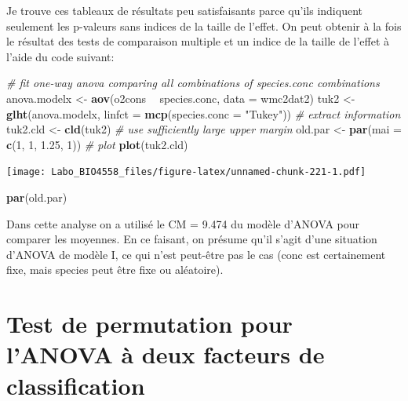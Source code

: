 \documentclass[12pt,]{book}
\newenvironment{Shaded}{\begin{snugshade}}{\end{snugshade}}
\newcommand{\CommentTok}[1]{\textcolor[rgb]{0.37,0.37,0.37}{\textit{#1}}}
\newcommand{\DataTypeTok}[1]{\textcolor[rgb]{0.27,0.27,0.27}{#1}}
\newcommand{\DecValTok}[1]{\textcolor[rgb]{0.06,0.06,0.06}{#1}}
\newcommand{\FloatTok}[1]{\textcolor[rgb]{0.06,0.06,0.06}{#1}}
\newcommand{\KeywordTok}[1]{\textcolor[rgb]{0.27,0.27,0.27}{\textbf{#1}}}
\newcommand{\NormalTok}[1]{#1}
\newcommand{\OperatorTok}[1]{\textcolor[rgb]{0.43,0.43,0.43}{\textbf{#1}}}
\newcommand{\StringTok}[1]{\textcolor[rgb]{0.5,0.5,0.5}{#1}}
\begin{document}
Je trouve ces tableaux de résultats peu satisfaisants parce qu'ils indiquent seulement les p-valeurs sans indices de la taille de l'effet. On peut obtenir à la fois le résultat des tests de comparaison multiple et un indice de la taille de l'effet à l'aide du code suivant:

\begin{Shaded}
\begin{Highlighting}[]
\CommentTok{# fit one-way anova comparing all combinations of species.conc combinations}
\NormalTok{anova.modelx <-}\StringTok{ }\KeywordTok{aov}\NormalTok{(o2cons }\OperatorTok{~}\StringTok{ }\NormalTok{species.conc, }\DataTypeTok{data =}\NormalTok{ wmc2dat2)}
\NormalTok{tuk2 <-}\StringTok{ }\KeywordTok{glht}\NormalTok{(anova.modelx, }\DataTypeTok{linfct =} \KeywordTok{mcp}\NormalTok{(}\DataTypeTok{species.conc =} \StringTok{"Tukey"}\NormalTok{))}
\CommentTok{# extract information}
\NormalTok{tuk2.cld <-}\StringTok{ }\KeywordTok{cld}\NormalTok{(tuk2)}
\CommentTok{# use sufficiently large upper margin}
\NormalTok{old.par <-}\StringTok{ }\KeywordTok{par}\NormalTok{(}\DataTypeTok{mai =} \KeywordTok{c}\NormalTok{(}\DecValTok{1}\NormalTok{, }\DecValTok{1}\NormalTok{, }\FloatTok{1.25}\NormalTok{, }\DecValTok{1}\NormalTok{))}
\CommentTok{# plot}
\KeywordTok{plot}\NormalTok{(tuk2.cld)}
\end{Highlighting}
\end{Shaded}

\texttt{[image: Labo\_BIO4558\_files/figure-latex/unnamed-chunk-221-1.pdf]}

\begin{Shaded}
\begin{Highlighting}[]
\KeywordTok{par}\NormalTok{(old.par)}
\end{Highlighting}
\end{Shaded}

Dans cette analyse on a utilisé le CM = 9.474 du modèle d'ANOVA pour comparer les moyennes. En ce faisant, on présume qu'il s'agit d'une situation d'ANOVA de modèle I, ce qui n'est peut-être pas le cas (conc est certainement fixe, mais species peut être fixe ou aléatoire).

\hypertarget{test-de-permutation-pour-lanova-uxe0-deux-facteurs-de-classification}{%
\section{Test de permutation pour l'ANOVA à deux facteurs de classification}\label{test-de-permutation-pour-lanova-uxe0-deux-facteurs-de-classification}}
\end{document}

